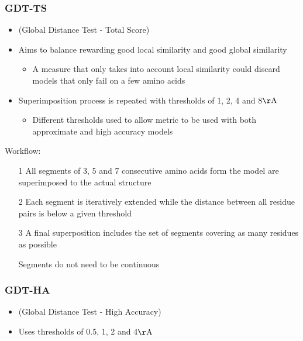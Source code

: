 \documentclass[a4paper]{article}
\begin{document}
\subsubsection{GDT-TS}

\begin{itemize}
  \item
    (Global Distance Test - Total Score)

  \item
    Aims to balance rewarding good local similarity and good global similarity

    \begin{itemize}
      \item
        A measure that only takes into account local similarity could discard
        models that only fail on a few amino acids
    \end{itemize}

  \item
    Superimposition process is repeated with thresholds of 1, 2, 4 and
    8$\mathrm{\AA}$

    \begin{itemize}
      \item
        Different thresholds used to allow metric to be used with both
        approximate and high accuracy models
    \end{itemize}
\end{itemize}

Workflow:

\begin{enumerate}
  \item[1]
    All segments of 3, 5 and 7 consecutive amino acids form the model are
    superimposed to the actual structure

  \item[2]
    Each segment is iteratively extended while the distance between all residue
    pairs is below a given threshold

  \item[3]
    A final superposition includes the set of segments covering as many residues
    as possible

    Segments do not need to be continuous
\end{enumerate}

\subsubsection{GDT-HA}

\begin{itemize}
  \item
    (Global Distance Test - High Accuracy)

  \item
    Uses thresholds of 0.5, 1, 2 and 4$\mathrm{\AA}$
\end{itemize}
\end{document}
